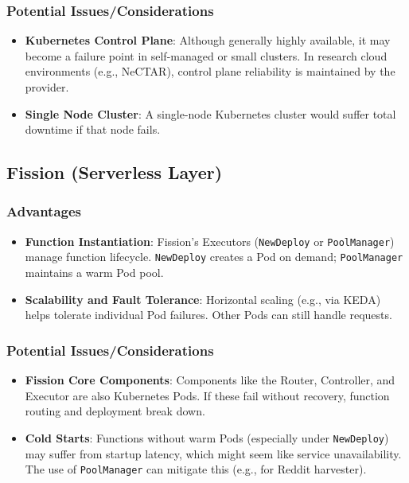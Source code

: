 \documentclass[]{article}
\numberwithin{equation}{section}
\begin{document}
\subsubsection*{Potential Issues/Considerations}
\begin{itemize}
  \item \textbf{Kubernetes Control Plane}: Although generally highly available, it may become a failure point in self-managed or small clusters. In research cloud environments (e.g., NeCTAR), control plane reliability is maintained by the provider.
  \item \textbf{Single Node Cluster}: A single-node Kubernetes cluster would suffer total downtime if that node fails.
\end{itemize}

\subsection*{Fission (Serverless Layer)}

\subsubsection*{Advantages}
\begin{itemize}
  \item \textbf{Function Instantiation}: Fission’s Executors (\texttt{NewDeploy} or \texttt{PoolManager}) manage function lifecycle. \texttt{NewDeploy} creates a Pod on demand; \texttt{PoolManager} maintains a warm Pod pool.
  \item \textbf{Scalability and Fault Tolerance}: Horizontal scaling (e.g., via KEDA) helps tolerate individual Pod failures. Other Pods can still handle requests.
\end{itemize}

\subsubsection*{Potential Issues/Considerations}
\begin{itemize}
  \item \textbf{Fission Core Components}: Components like the Router, Controller, and Executor are also Kubernetes Pods. If these fail without recovery, function routing and deployment break down.
  \item \textbf{Cold Starts}: Functions without warm Pods (especially under \texttt{NewDeploy}) may suffer from startup latency, which might seem like service unavailability. The use of \texttt{PoolManager} can mitigate this (e.g., for Reddit harvester).
\end{itemize}
\end{document}
